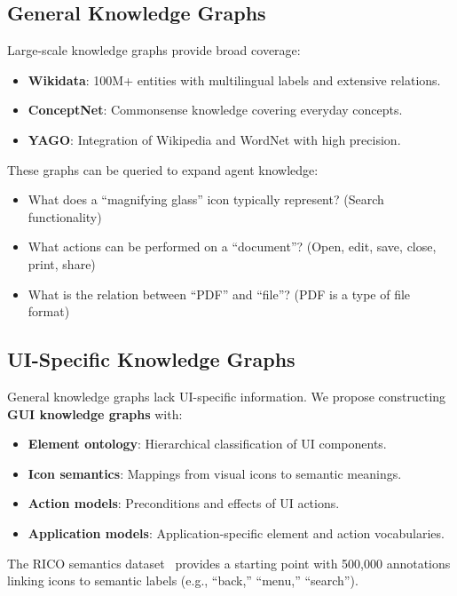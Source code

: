 \documentclass[11pt]{article}
\begin{document}
\subsection{General Knowledge Graphs}

Large-scale knowledge graphs provide broad coverage:

\begin{itemize}
    \item \textbf{Wikidata}: 100M+ entities with multilingual labels and extensive relations.
    \item \textbf{ConceptNet}: Commonsense knowledge covering everyday concepts.
    \item \textbf{YAGO}: Integration of Wikipedia and WordNet with high precision.
\end{itemize}

These graphs can be queried to expand agent knowledge:

\begin{itemize}
    \item What does a ``magnifying glass'' icon typically represent? (Search functionality)
    \item What actions can be performed on a ``document''? (Open, edit, save, close, print, share)
    \item What is the relation between ``PDF'' and ``file''? (PDF is a type of file format)
\end{itemize}

\subsection{UI-Specific Knowledge Graphs}

General knowledge graphs lack UI-specific information. We propose constructing \textbf{GUI knowledge graphs} with:

\begin{itemize}
    \item \textbf{Element ontology}: Hierarchical classification of UI components.
    \item \textbf{Icon semantics}: Mappings from visual icons to semantic meanings.
    \item \textbf{Action models}: Preconditions and effects of UI actions.
    \item \textbf{Application models}: Application-specific element and action vocabularies.
\end{itemize}

The RICO semantics dataset~\cite{ricosemantics2019} provides a starting point with 500,000 annotations linking icons to semantic labels (e.g., ``back,'' ``menu,'' ``search'').
\end{document}

